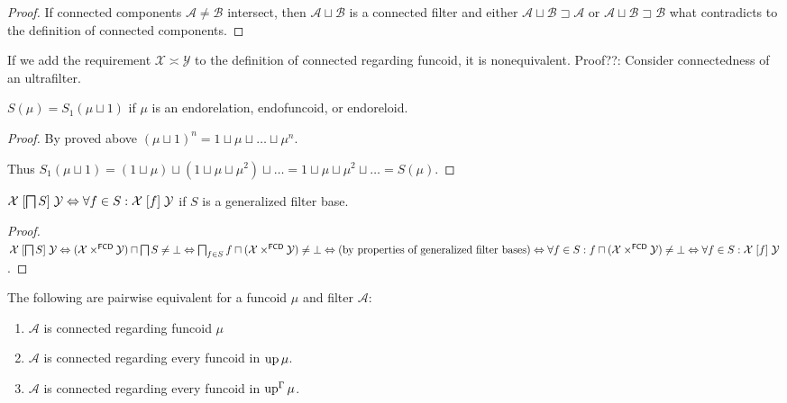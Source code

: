 \begin{proof}
  If connected components $\mathcal{A} \neq \mathcal{B}$ intersect, then
  $\mathcal{A} \sqcup \mathcal{B}$ is a connected filter and either
  $\mathcal{A} \sqcup \mathcal{B} \sqsupset \mathcal{A}$ or $\mathcal{A}
  \sqcup \mathcal{B} \sqsupset \mathcal{B}$ what contradicts to the definition
  of connected components.
\end{proof}

If we add the requirement $\mathcal{X} \asymp \mathcal{Y}$ to the definition
of connected regarding funcoid, it is nonequivalent. Proof??: Consider
connectedness of an ultrafilter.

\begin{prop}
  $S (\mu) = S_1 (\mu \sqcup 1)$ if $\mu$ is an endorelation, endofuncoid, or
  endoreloid. 
\end{prop}

\begin{proof}
  By proved above $(\mu \sqcup 1)^n = 1 \sqcup \mu \sqcup \ldots \sqcup
  \mu^n$.

  Thus $S_1 (\mu \sqcup 1) = (1 \sqcup \mu) \sqcup (1 \sqcup \mu \sqcup \mu^2)
  \sqcup \ldots = 1 \sqcup \mu \sqcup \mu^2 \sqcup \ldots = S (\mu)$.
\end{proof}


\begin{thm}
  $\mathcal{X} \mathrel{\left[ \bigsqcap S \right]} \mathcal{Y}
  \Leftrightarrow \forall f \in S : \mathcal{X} \mathrel{\left[f\right]} \mathcal{Y}$ if
  $S$ is a generalized filter base.
\end{thm}

\begin{proof}
  $\mathcal{X} \mathrel{\left[ \bigsqcap S \right]} \mathcal{Y}
  \Leftrightarrow (\mathcal{X} \times^{\mathsf{FCD}} \mathcal{Y})
  \sqcap \bigsqcap S \neq \bot \Leftrightarrow \bigsqcap_{f \in S} f \sqcap
  (\mathcal{X} \times^{\mathsf{FCD}} \mathcal{Y}) \neq \bot
  \Leftrightarrow \text{(by properties of generalized filter bases)}
  \Leftrightarrow \forall f \in S : f \sqcap (\mathcal{X}
  \times^{\mathsf{FCD}} \mathcal{Y}) \neq \bot \Leftrightarrow \forall
  f \in S : \mathcal{X} \mathrel{\left[f\right]} \mathcal{Y}$.
\end{proof}

\begin{thm}
  The following are pairwise equivalent for a funcoid $\mu$ and filter
  $\mathcal{A}$:
  \begin{enumerate}
    \item $\mathcal{A}$ is connected regarding funcoid $\mu$

    \item $\mathcal{A}$ is connected regarding every funcoid in $\operatorname{up}
    \mu$.

    \item $\mathcal{A}$ is connected regarding every funcoid in
    $\operatorname{up}^{\Gamma} \mu$.
  \end{enumerate}
\end{thm}

